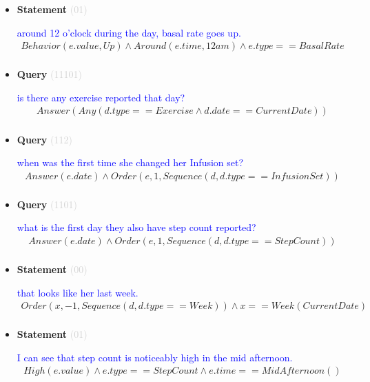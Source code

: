 \documentclass[11pt]{article}
\newcommand{\key}[1]{\textcolor{lightgray}{#1}}
\newcounter{CQuery}
\newcounter{CStatement}
\begin{document}
\begin{itemize}
\item
\textbf{Statement\theCStatement} \key{(01)} \addtocounter{CStatement}{1}
\textcolor{blue}{ around 12 o'clock during the day, basal rate goes up. }
\begin{multline*}
Behavior(e.value, Up) \wedge Around(e.time, 12am) \wedge e.type==BasalRate \\ 
\end{multline*}


\item
\textbf{Query\theCQuery} \key{(11101)} \addtocounter{CQuery}{1}
\textcolor{blue}{ is there any exercise reported that day? }
\begin{multline*}
Answer(Any(d.type==Exercise \wedge d.date==CurrentDate)) \\ 
\end{multline*}


\item
\textbf{Query\theCQuery} \key{(112)} \addtocounter{CQuery}{1}
\textcolor{blue}{ when was the first time she changed her Infusion set? }
\begin{multline*}
Answer(e.date) \wedge Order(e, 1, Sequence(d, d.type==InfusionSet)) \\ 
\end{multline*}


\item
\textbf{Query\theCQuery} \key{(1101)} \addtocounter{CQuery}{1}
\textcolor{blue}{ what is the first day they also have step count reported? }
\begin{multline*}
Answer(e.date) \wedge Order(e, 1, Sequence(d, d.type==StepCount)) \\ 
\end{multline*}


\item
\textbf{Statement\theCStatement} \key{(00)} \addtocounter{CStatement}{1}
\textcolor{blue}{ that looks like her last week. }
\begin{multline*}
Order(x, -1, Sequence(d, d.type==Week)) \wedge x==Week(CurrentDate) \\ 
\end{multline*}


\item
\textbf{Statement\theCStatement} \key{(01)} \addtocounter{CStatement}{1}
\textcolor{blue}{ I can see that step count is noticeably high in the mid afternoon. }
\begin{multline*}
High(e.value) \wedge e.type==StepCount \wedge e.time==MidAfternoon() \\ 
\end{multline*}



\end{itemize}
\end{document}
